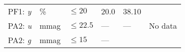 \documentclass[DM,toc]{lsstdoc}
\begin{document}
\begin{longtable}[]{@{}llllll@{}}
\begin{minipage}[t]{0.14\columnwidth}
PF1: \emph{y}\strut
\end{minipage} & \begin{minipage}[t]{0.06\columnwidth}\raggedright\strut
\%\strut
\end{minipage} & \begin{minipage}[t]{0.17\columnwidth}\raggedright\strut
\(\leq 20\)\strut
\end{minipage} & \begin{minipage}[t]{0.17\columnwidth}\raggedright\strut
20.0\strut
\end{minipage} & \begin{minipage}[t]{0.12\columnwidth}\raggedright\strut
38.10\strut
\end{minipage} & \begin{minipage}[t]{0.17\columnwidth}\raggedright\strut
\strut
\end{minipage}\tabularnewline
\begin{minipage}[t]{0.14\columnwidth}\raggedright\strut
PA2: \emph{u}\strut
\end{minipage} & \begin{minipage}[t]{0.06\columnwidth}\raggedright\strut
mmag\strut
\end{minipage} & \begin{minipage}[t]{0.17\columnwidth}\raggedright\strut
\(\leq 22.5\)\strut
\end{minipage} & \begin{minipage}[t]{0.17\columnwidth}\raggedright\strut
---\strut
\end{minipage} & \begin{minipage}[t]{0.12\columnwidth}\raggedright\strut
---\strut
\end{minipage} & \begin{minipage}[t]{0.17\columnwidth}\raggedright\strut
No data\strut
\end{minipage}\tabularnewline
\begin{minipage}[t]{0.14\columnwidth}\raggedright\strut
PA2: \emph{g}\strut
\end{minipage} & \begin{minipage}[t]{0.06\columnwidth}\raggedright\strut
mmag\strut
\end{minipage} & \begin{minipage}[t]{0.17\columnwidth}\raggedright\strut
\(\leq 15\)\strut
\end{minipage} & \begin{minipage}[t]{0.17\columnwidth}\raggedright\strut
---\strut
\end{minipage} & \begin{minipage}[t]{0.12\columnwidth}\raggedright\strut

\end{minipage}
\end{longtable}
\end{document}
